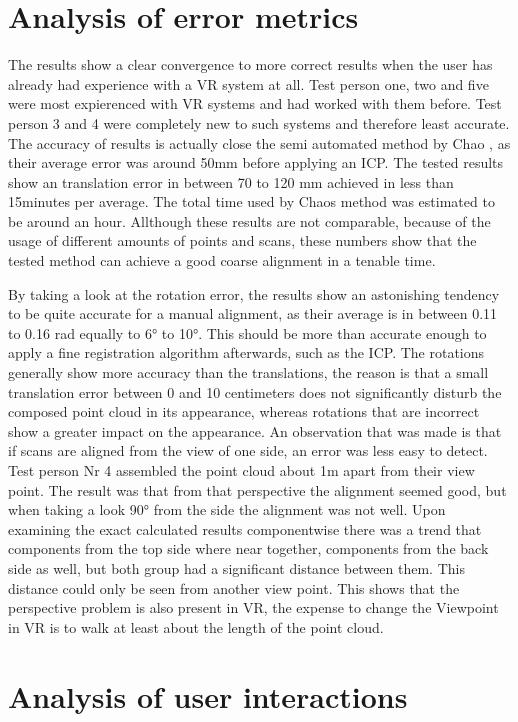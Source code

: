 \documentclass[hyperref,english,bachelorofscience,bibnum]{cgvpub}
\begin{document}
\section{Analysis of error metrics}

The results show a clear convergence to more correct results when the user has already had experience with a VR system at all. Test person one, two and five were most expierenced with VR systems and had worked with them before. Test person 3 and 4 were completely new to such systems and therefore least accurate. The accuracy of results is actually close the semi automated method by Chao \cite{Chao}, as their average error was around 50mm before applying an ICP. The tested results show an translation error in between 70 to 120 mm achieved in less than 15minutes per average. The total time used by Chaos method was estimated to be around an hour\cite{Chao}. Allthough these results are not comparable, because of the usage of different amounts of points and scans, these numbers show that the tested method can achieve a good coarse alignment in a tenable time.

By taking a look at the rotation error, the results show an astonishing tendency to be quite accurate for a manual alignment, as their average is in between 0.11 to 0.16 rad equally to 6° to 10°. This should be more than accurate enough to apply a fine registration algorithm afterwards, such as the ICP. The rotations generally show more accuracy than the translations, the reason is that a small translation error between 0 and 10 centimeters does not significantly disturb the composed point cloud in its appearance, whereas rotations that are incorrect show a greater impact on the appearance. An observation that was made is that if scans are aligned from the view of one side, an error was less easy to detect. Test person Nr 4 assembled the point cloud about 1m apart from their view point. The result was that from that perspective the alignment seemed good, but when taking a look 90° from the side the alignment was not well. Upon examining the exact calculated results componentwise there was a trend that components from the top side where near together, components from the back side as well, but both group had a significant distance between them. This distance could only be seen from another view point. This shows that the perspective problem is also present in VR, the expense to change the Viewpoint in VR is to walk at least about the length of the point cloud. %

\section{Analysis of user interactions}
\end{document}
